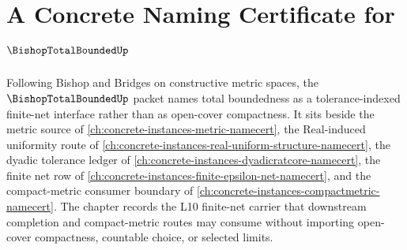 \chapter{A Concrete Naming Certificate for $\BishopTotalBoundedUp$}
\label{ch:concrete-instances-bishop-total-bounded-namecert}

Following Bishop and Bridges on constructive metric spaces, the $\BishopTotalBoundedUp$ packet names total boundedness as a tolerance-indexed finite-net interface rather than as open-cover compactness. It sits beside the metric source of \autoref{ch:concrete-instances-metric-namecert}, the Real-induced uniformity route of \autoref{ch:concrete-instances-real-uniform-structure-namecert}, the dyadic tolerance ledger of \autoref{ch:concrete-instances-dyadicratcore-namecert}, the finite net row of \autoref{ch:concrete-instances-finite-epsilon-net-namecert}, and the compact-metric consumer boundary of \autoref{ch:concrete-instances-compactmetric-namecert}. The chapter records the L10 finite-net carrier that downstream completion and compact-metric routes may consume without importing open-cover compactness, countable choice, or selected limits.


